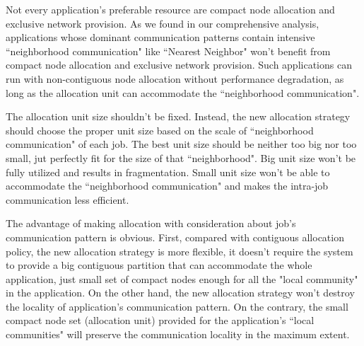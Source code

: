 \documentclass[conference]{IEEEtran}
\begin{document}
Not every application's preferable resource are compact node allocation and exclusive network provision. As we found in our comprehensive analysis, applications whose dominant communication patterns contain intensive ``neighborhood communication" like ``Nearest Neighbor" won't benefit from compact node allocation and exclusive network provision. Such applications can run with non-contiguous node allocation without performance degradation, as long as the allocation unit can accommodate the ``neighborhood communication".

The allocation unit size shouldn't be fixed. Instead, the new allocation strategy should choose the proper unit size based on the scale of ``neighborhood communication" of each job. The best unit size should be neither too big nor too small, jut perfectly fit for the size of that ``neighborhood". Big unit size won't be fully utilized and results in fragmentation. Small unit size won't be able to accommodate the ``neighborhood communication" and makes the intra-job communication less efficient. 


The advantage of making allocation with consideration about job's communication pattern is obvious. First, compared with contiguous allocation policy, the new allocation strategy is more flexible, it doesn't require the system to provide a big contiguous partition that can accommodate the whole application, just small set of compact nodes enough for all the "local community" in the application. On the other hand, the new allocation strategy won't destroy the locality of application's communication pattern. On the contrary, the small compact node set (allocation unit) provided for the application's  ``local communities"  will preserve the communication locality in the maximum extent.


%
%
\end{document}
